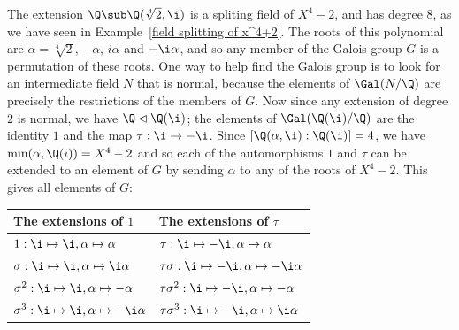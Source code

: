 \begin{example}
The extension $\Q\sub\Q(\sqrt[4]{2},\i)$ is a spliting field of $X^4-2$, and has degree $8$, as we have seen in Example~\ref{field splitting of x^4+2}. The roots of this polynomial are $\alpha=\sqrt[4]{2}$, $-\alpha$, $i\alpha$ and $-\i\alpha$, and so any member of the Galois group $G$ is a permutation of these roots. One way to help find the Galois group is to look for an intermediate field $N$ that is normal, because the elements of $\Gal(N/\Q)$ are precisely the restrictions of the members of $G$. Now since any extension of degree $2$ is normal, we have $\Q\lhd\Q(\i)$; the elements of $\Gal(\Q(\i)/\Q)$ are the identity $1$ and the map $\tau:\i\to-\i$. Since $[\Q(\alpha,\i):\Q(\i)]=4$, we have $\min(\alpha,\Q(i))=X^4-2$ and so each of the automorphisms $1$ and $\tau$ can be extended to an element of $G$ by sending $\alpha$ to any of the roots of $X^4-2$. This gives all elements of $G$:
\begin{table}[htbp]
\centering
\begin{tabular}{l|l}
\hline
The extensions of $1$& The extensions of $\tau$\\
\hline
$1:\i\mapsto \i,\alpha\mapsto\alpha$&$\tau:\i\mapsto-\i,\alpha\mapsto \alpha$\\
$\sigma:\i\mapsto \i,\alpha\mapsto \i\alpha$&$\tau\sigma:\i\mapsto-\i,\alpha\mapsto -\i\alpha$\\
$\sigma^2:\i\mapsto \i,\alpha\mapsto-\alpha$&$\tau\sigma^2:\i\mapsto-\i,\alpha\mapsto-\alpha$\\
$\sigma^3:\i\mapsto \i,\alpha\mapsto-\i\alpha$&$\tau\sigma^3:\i\mapsto-\i,\alpha\mapsto \i\alpha$\\
\hline
\end{tabular}
\end{table}


\end{example}
